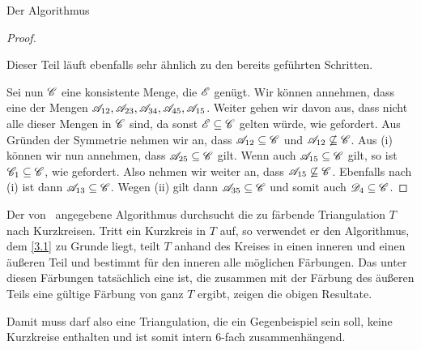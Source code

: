 \begin{section}{Der Algorithmus}
\begin{proof}
\begin{enumerate}[(i)]
   Dieser Teil läuft ebenfalls sehr ähnlich zu den bereits geführten Schritten.
  \end{enumerate}
  Sei nun $\mathscr{C}$ eine konsistente Menge, die $\mathscr{E}$ genügt. Wir können annehmen, dass eine der Mengen $\mathscr{A}_{12},\mathscr{A}_{23},\mathscr{A}_{34},\mathscr{A}_{45},\mathscr{A}_{15}$. Weiter gehen wir davon aus, dass nicht alle dieser Mengen in $\mathscr{C}$ sind, da sonst $\mathscr{E}\subseteq\mathscr{C}$ gelten würde, wie gefordert. Aus Gründen der Symmetrie nehmen wir an, dass $\mathscr{A}_{12}\subseteq\mathscr{C}$ und $\mathscr{A}_{12}\not\subseteq\mathscr{C}$. Aus (i) können wir nun annehmen, dass $\mathscr{A}_{25}\subseteq\mathscr{C}$ gilt. Wenn auch $\mathscr{A}_{15}\subseteq\mathscr{C}$ gilt, so ist $\mathscr{C}_1\subseteq\mathscr{C}$, wie gefordert. Also nehmen wir weiter an, dass $\mathscr{A}_{15}\not\subseteq\mathscr{C}$. Ebenfalls nach (i) ist dann $\mathscr{A}_{13}\subseteq\mathscr{C}$. Wegen (ii) gilt dann $\mathscr{A}_{35}\subseteq\mathscr{C}$ und somit auch $\mathscr{D}_4\subseteq\mathscr{C}$.
 \end{proof}
 
 Der von \rsst\-\ angegebene Algorithmus durchsucht die zu färbende Triangulation $T$ nach Kurzkreisen. Tritt ein Kurzkreis in $T$ auf, so verwendet er den Algorithmus, dem \ref{3.1} zu Grunde liegt, teilt $T$ anhand des Kreises in einen inneren und einen äußeren Teil und bestimmt für den inneren alle möglichen Färbungen. Das unter diesen Färbungen tatsächlich eine ist, die zusammen mit der Färbung des äußeren Teils eine gültige Färbung von ganz $T$ ergibt, zeigen die obigen Resultate.
 
 Damit muss darf also eine Triangulation, die ein Gegenbeispiel sein soll, keine Kurzkreise enthalten und ist somit intern 6-fach zusammenhängend.
\end{section}